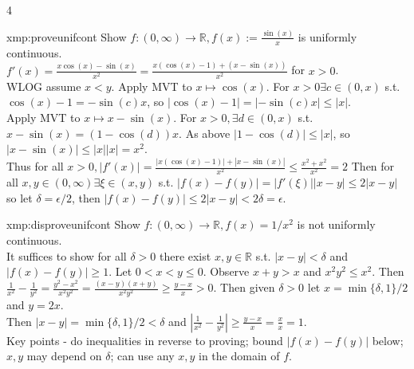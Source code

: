 \documentclass[landscape, 8pt]{extarticle}
\begin{document}
\begin{multicols*}{4}
		
		\begin{xmp}{xmp:proveunifcont}{ }
		Show $f: (0, \infty) \to \mathbb{R}, f(x) := \frac{\sin(x)}{x}$ is uniformly continuous.\\
		$f'(x) = \frac{x\cos(x) - \sin(x)}{x^2} = \frac{x(\cos(x)-1) + (x-\sin(x))}{x^2}$ for $x > 0$.\\
		WLOG assume $x < y$. Apply MVT to $x \mapsto \cos(x)$. For $x > 0 \exists c\in (0, x)$ s.t. $\cos(x) -1 = -\sin(c)x$, so $\left|\cos(x) - 1\right| = \left|-\sin(c)x\right| \le \left|x\right|$.\\
		Apply MVT to $x \mapsto x - \sin(x)$. For $x > 0, \exists d\in (0, x)$ s.t. $x-\sin(x) = (1-\cos(d))x$. As above $\left|1-\cos(d)\right| \le \left|x\right|$, so $\left|x-\sin(x)\right| \le \left|x\right| \left|x\right| = x^2$.\\
		Thus for all $x > 0, \left|f'(x)\right| = \frac{\left|x(\cos(x)-1)\right| + \left|x-\sin(x)\right|}{x^2} \le \frac{x^2 + x^2}{x^2} = 2$
		Then for all $x, y\in (0, \infty) \exists \xi\in (x, y)$ s.t. $\left|f(x) - f(y)\right| = \left|f'(\xi)\right| \left|x-y\right| \le 2\left|x-y\right|$ so let $\delta =\epsilon/2$, then $\left|f(x) - f(y)\right| \le 2\left|x-y\right| < 2 \delta =\epsilon$.
		
		\end{xmp}
		
		
		\begin{xmp}{xmp:disproveunifcont}{ }
		Show $f: (0, \infty) \to \mathbb{R}, f(x) = 1/x^2$ is not uniformly continuous.\\
		It suffices to show for all $\delta > 0$ there exist $x, y\in \mathbb{R}$ s.t. $\left|x-y\right| < \delta$ and $\left|f(x) - f(y)\right| \ge 1$. Let $0 < x < y \le 0$. Observe $x + y > x$ and $x^2 y^2 \le x^2$. Then $\frac{1}{x^2} - \frac{1}{y^2} = \frac{y^2 - x^2}{x^2y^2} = \frac{(x-y)(x+y)}{x^2y^2} \ge \frac{y-x}{x} > 0$. Then given $\delta >0$ let $x = \min\{\delta, 1\}/2$ and $y=2x$. \\
		Then $\left|x-y\right| = \min\{\delta, 1\}/2 < \delta$ and $\left|\frac{1}{x^2} - \frac{1}{y^2}\right| \ge \frac{y-x}{x} = \frac{x}{x} = 1$.\\
		Key points - do inequalities in reverse to proving; bound $\left|f(x) - f(y)\right|$ below; $x, y$ may depend on $\delta$; can use any $x, y$ in the domain of $f$.
		
		\end{xmp}
		
		
		

\end{multicols*}
\end{document}
